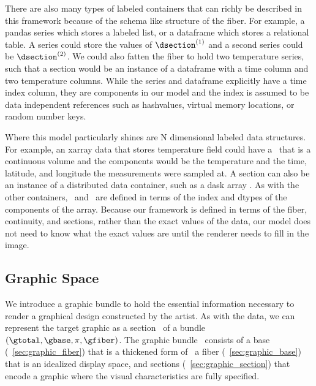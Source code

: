 \documentclass[../main.tex]{subfiles}
\begin{document}
There are also many types of labeled containers that can richly be described in this framework because of the schema like structure of the fiber. For example, a pandas series which stores a labeled list, or a dataframe\cite{jeff_reback_2020_3715232} which stores a relational table. A series could store the values of $\dsection^{(1)}$ and a second series could be  $\dsection^{(2)}$. We could also fatten the fiber to hold two temperature series, such that a section would be an instance of a dataframe with a time column and two temperature columns. While the series and dataframe explicitly have a time index column, they are components in our model and the index is assumed to be data independent references such as hashvalues, virtual memory locations, or random number keys.

Where this model particularly shines are N dimensional labeled data structures. For example, an xarray\cite{hoyer2017xarray} data that stores temperature field could have a \dbase\ that is a continuous volume and the components would be the temperature and the time, latitude, and longitude the measurements were sampled at. A section can also be an instance of a distributed data container, such as a dask array \cite{rocklinDaskParallelComputation2015}. As with the other containers, \dbase\ and \dfiber\ are defined in terms of the index and dtypes of the components of the array. Because our framework is defined in terms of the fiber, continuity, and sections, rather than the exact values of the data, our model does not need to know what the exact values are until the renderer needs to fill in the image.  


\subsection{Graphic Space \gtotal}
\label{sec:graphic}  
We introduce a graphic bundle to hold the essential information necessary to render a graphical design constructed by the artist. As with the data, we can represent the target graphic as a section \gsection\ of a bundle  $(\gtotal, \gbase, \pi, \gfiber)$. The graphic bundle \gtotal\ consists of a base \gbase (~\ref{sec:graphic_fiber}) that is a thickened form of \dbase\, 
a fiber \gfiber (~\ref{sec:graphic_base}) that is an idealized display space, and sections \gsection (~\ref{sec:graphic_section}) that encode a graphic where the visual characteristics are fully specified.
\end{document}
